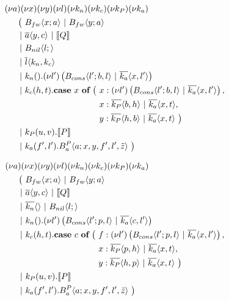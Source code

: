 \begin{align*}
  &\anew{a}{\anew{x}{\anew{y}{\anew{l}{\anew{k_n}{\anew{k_c}{\anew{k_P}{\anew{k_a}{ \\
    &\hspace{0.5cm}
    \begin{aligned}[t]
      \big(\ &\ains{B_{fw}}{x}{a}
      \apar   \ains{B_{fw}}{y}{a} \\
      \apar  &\asnd{a}{y,c} \apar \encMJtoAP{Q} \\
      \apar  &\ains{B_{nil}}{l}{} \\
      \apar  &\asnd{l}{k_n,k_c} \\
      \apar  &\arcv{k_n}{} . \anew{l'}{\parens{\ains{B_{cons}}{l'}{b, l} \apar \asnd{k_a}{x, l'}}} \\
      \apar  &\arcv{k_c}{h,t} .
        \begin{aligned}[t]
          \acse*{x}{
          \ &\aalt{x}{\anew{l'}{\parens{\ains{B_{cons}}{l'}{b, l} \apar \asnd{k_a}{x, l'}}}}, \\
            &\aalt{x}{\asnd{k_P}{b,h} \apar \asnd{k_a}{x,t}}, \\
            &\aalt{y}{\asnd{k_P}{h,b} \apar \asnd{k_a}{x,t}}
          \ }
        \end{aligned} \\
      \apar  &\arcv{k_P}{u,v} . \encMJtoAP{P} \\
      \apar  &\arcv{k_a}{f',l'} . \ains{B_a^P}{a}{x, y, f', l',\tilde{z}}
      \ \big)
    \end{aligned}
  }}}}}}}}
\end{align*}

\TODO{2cm}{}

\begin{align*}
  &\anew{a}{\anew{x}{\anew{y}{\anew{l}{\anew{k_n}{\anew{k_c}{\anew{k_P}{\anew{k_a}{ \\
    &\hspace{0.5cm}
    \begin{aligned}[t]
      \big(\ &\ains{B_{fw}}{x}{a}
      \apar   \ains{B_{fw}}{y}{a} \\
      \apar  &\asnd{a}{y,c} \apar \encMJtoAP{Q} \\
      \apar  &\asnd{k_n}{} \apar \ains{B_{nil}}{l}{} \\
      \apar  &\arcv{k_n}{} . \anew{l'}{\parens{\ains{B_{cons}}{l'}{p, l} \apar \asnd{k_a}{c, l'}}} \\
      \apar  &\arcv{k_c}{h,t} .
        \begin{aligned}[t]
          \acse*{c}{
          \ &\aalt{f}{\anew{l'}{\parens{\ains{B_{cons}}{l'}{p, l} \apar \asnd{k_a}{x, l'}}}}, \\
            &\aalt{x}{\asnd{k_P}{p,h} \apar \asnd{k_a}{x,t}}, \\
            &\aalt{y}{\asnd{k_P}{h,p} \apar \asnd{k_a}{x,t}}
          \ }
        \end{aligned} \\
      \apar  &\arcv{k_P}{u,v} . \encMJtoAP{P} \\
      \apar  &\arcv{k_a}{f',l'} . \ains{B_a^P}{a}{x, y, f', l',\tilde{z}}
      \ \big)
    \end{aligned}
  }}}}}}}}
\end{align*}

